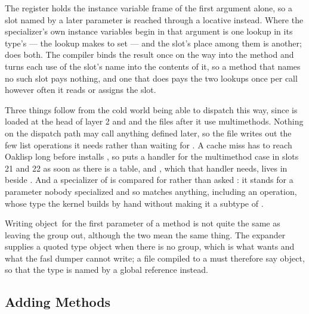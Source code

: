 The  register holds the instance variable frame of the first
argument alone, so a slot named by a later parameter is reached
through a locative instead.  Where the specializer's own instance
variables begin in that argument is one lookup in its type's
 --- the lookup  makes to set 
--- and the slot's place among them is another;
 does both.  The compiler binds the result
once on the way into the method and turns each use of the slot's name
into the contents of it, so a method that names no such slot pays
nothing, and one that does pays the two lookups once per call however
often it reads or assigns the slot.

Three things follow from the cold world being able to dispatch this
way, since  is loaded at the head of layer 2 and
 and the files after it use multimethods.  Nothing on
the dispatch path may call anything defined later, so the file writes
out the few list operations it needs rather than waiting for
.  A cache miss has to reach Oaklisp long before
 installs , so 
puts a handler for the multimethod case in slots 21 and 22 as soon as
there is a table, and , which that handler needs, lives in
 beside .  And a specializer of
 is compared for rather than asked : it
stands for a parameter nobody specialized and so matches anything,
including an operation, whose type the kernel builds by hand without
making it a subtype of .

Writing \lpar object\rpar\ for the first parameter of a method is not
quite the same as leaving the group out, although the two mean the
same thing.  The  expander supplies a quoted type
object when there is no group, which is what  wants and
what the fasl dumper cannot write; a file compiled to a  must
therefore say \lpar object\rpar, so that the type is named by a
global reference instead.

\subsection{Adding Methods}

